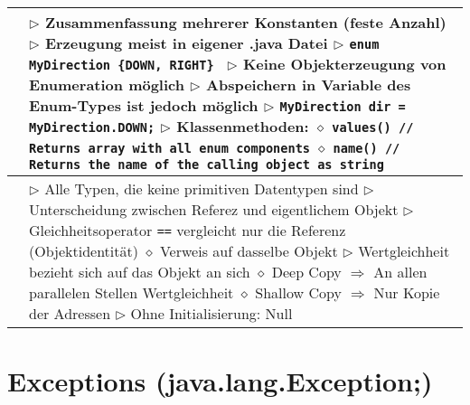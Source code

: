 \begin{tabular}{ | p{4cm} p{13.5cm} | }
	\makecell[l]{Enumeration} & \makecell[l]{$\rhd$ Zusammenfassung mehrerer Konstanten (feste Anzahl)\\
	$\rhd$ Erzeugung meist in eigener .java Datei \\
	$\rhd$ \texttt{enum MyDirection \{DOWN, RIGHT\} } \\
	$\rhd$ Keine Objekterzeugung von Enumeration möglich \\
	$\rhd$ Abspeichern in Variable des Enum-Types ist jedoch möglich \\
	$\rhd$ \texttt{MyDirection dir = MyDirection.DOWN;} \\
	$\rhd$ Klassenmethoden: \\
	\hspace{0.4cm} $\diamond$ \texttt{values() // Returns array with all enum components} \\
	\hspace{0.4cm} $\diamond$ \texttt{name() // Returns the name of the calling object as string} \\
	 } \\ \hline
	
	\makecell[l]{Referenztypen} & \makecell[l]{$\rhd$ Alle Typen, die keine primitiven Datentypen sind \\
	$\rhd$ Unterscheidung zwischen Referez und eigentlichem Objekt \\
	$\rhd$ Gleichheitsoperator \texttt{==} vergleicht nur die Referenz (Objektidentität) \\
	\hspace{0.4cm} $\diamond$ Verweis auf dasselbe Objekt \\
	$\rhd$ Wertgleichheit bezieht sich auf das Objekt an sich \\
	\hspace{0.4cm} $\diamond$ Deep Copy $\Rightarrow$ An allen parallelen Stellen Wertgleichheit \\
	\hspace{0.4cm} $\diamond$ Shallow Copy $\Rightarrow$ Nur Kopie der Adressen \\
	$\rhd$ Ohne Initialisierung: Null} \\ \hline
	\end{tabular}


\section{Exceptions (java.lang.Exception;)}

